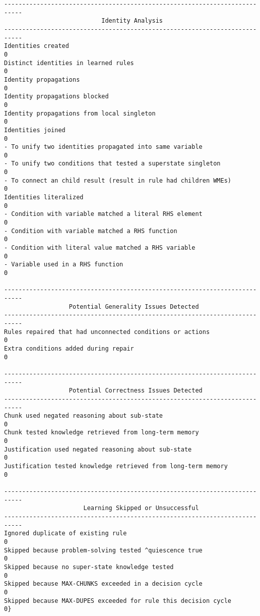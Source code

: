 \begin{center}
\begin{Verbatim}[fontsize=\small]
---------------------------------------------------------------------------
                           Identity Analysis
---------------------------------------------------------------------------
Identities created                                                     0
Distinct identities in learned rules                                   0
Identity propagations                                                  0
Identity propagations blocked                                          0
Identity propagations from local singleton                             0
Identities joined                                                      0
- To unify two identities propagated into same variable                0
- To unify two conditions that tested a superstate singleton           0
- To connect an child result (result in rule had children WMEs)        0
Identities literalized                                                 0
- Condition with variable matched a literal RHS element                0
- Condition with variable matched a RHS function                       0
- Condition with literal value matched a RHS variable                  0
- Variable used in a RHS function                                      0

---------------------------------------------------------------------------
                  Potential Generality Issues Detected
---------------------------------------------------------------------------
Rules repaired that had unconnected conditions or actions              0
Extra conditions added during repair                                   0

---------------------------------------------------------------------------
                  Potential Correctness Issues Detected
---------------------------------------------------------------------------
Chunk used negated reasoning about sub-state                           0
Chunk tested knowledge retrieved from long-term memory                 0
Justification used negated reasoning about sub-state                   0
Justification tested knowledge retrieved from long-term memory         0

---------------------------------------------------------------------------
                      Learning Skipped or Unsuccessful
---------------------------------------------------------------------------
Ignored duplicate of existing rule                                     0
Skipped because problem-solving tested ^quiescence true                0
Skipped because no super-state knowledge tested                        0
Skipped because MAX-CHUNKS exceeded in a decision cycle                0
Skipped because MAX-DUPES exceeded for rule this decision cycle        0}
\end{Verbatim}
\end{center}

